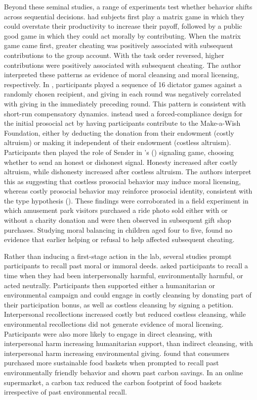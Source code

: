 \documentclass{article}
\begin{document}
Beyond these seminal studies, a range of experiments test whether behavior shifts across sequential decisions. \textcite{Secilmis2018} had subjects first play a matrix game in which they could overstate their productivity to increase their payoff, followed by a public good game in which they could act morally by contributing. When the matrix game came first, greater cheating was positively associated with subsequent contributions to the group account. With the task order reversed, higher contributions were positively associated with subsequent cheating. The author interpreted these patterns as evidence of moral cleansing and moral licensing, respectively. In \textcite{BranasGarza2013}, participants played a sequence of 16 dictator games against a randomly chosen recipient, and giving in each round was negatively correlated with giving in the immediately preceding round. This pattern is consistent with short-run compensatory dynamics. \textcite{Gneezy2012} instead used a forced-compliance design for the initial prosocial act by having participants contribute to the Make-a-Wish Foundation, either by deducting the donation from their endowment (costly altruism) or making it independent of their endowment (costless altruism). Participants then played the role of Sender in \citeauthor{Gneezy2005}'s (\citeyear{Gneezy2005}) signaling game, choosing whether to send an honest or dishonest signal. Honesty increased after costly altruism, while dishonesty increased after costless altruism. The authors interpret this as suggesting that costless prosocial behavior may induce moral licensing, whereas costly prosocial behavior may reinforce prosocial identity, consistent with the type hypothesis (\cite{deOliveira2011}). These findings were corroborated in a field experiment in which amusement park visitors purchased a ride photo sold either with or without a charity donation and were then observed in subsequent gift shop purchases. Studying moral balancing in children aged four to five, \textcite{Cameron2021} found no evidence that earlier helping or refusal to help affected subsequent cheating.
\par
Rather than inducing a first-stage action in the lab, several studies prompt participants to recall past moral or immoral deeds. \textcite{Fanghella2022} asked participants to recall a time when they had been interpersonally harmful, environmentally harmful, or acted neutrally. Participants then supported either a humanitarian or environmental campaign and could engage in costly cleansing by donating part of their participation bonus, as well as costless cleansing by signing a petition. Interpersonal recollections increased costly but reduced costless cleansing, while environmental recollections did not generate evidence of moral licensing. Participants were also more likely to engage in direct cleansing, with interpersonal harm increasing humanitarian support, than indirect cleansing, with interpersonal harm increasing environmental giving. \textcite{Panzone2021} found that consumers purchased more sustainable food baskets when prompted to recall past environmentally friendly behavior and shown past carbon savings. In an online supermarket, a carbon tax reduced the carbon footprint of food baskets irrespective of past environmental recall.
\end{document}
